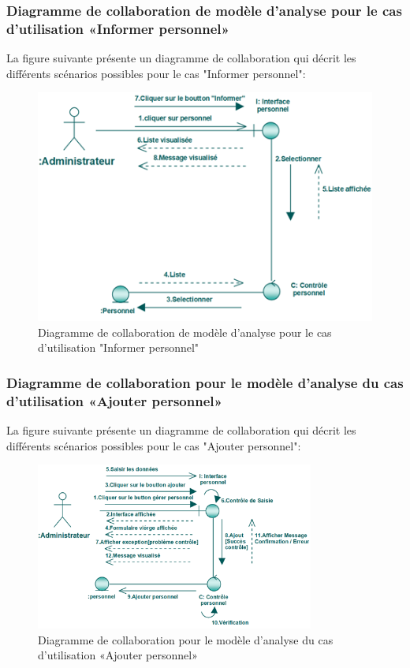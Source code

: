 \documentclass[12 pt]{report}
\begin{document}
\subsubsection{Diagramme  de  collaboration  de  modèle  d'analyse  pour  le  cas  d'utilisation «Informer personnel»  }
La figure suivante présente un diagramme de collaboration qui décrit les différents
scénarios possibles pour le cas "Informer personnel":
\begin{figure}[h]
\begin{center}
\includegraphics[width= 12 cm , height =7 cm]{colla_admin_informerpersonnel.png}
 \caption{Diagramme  de  collaboration  de  modèle  d'analyse  pour  le  cas  d'utilisation "Informer personnel"}
\end{center}
\end{figure}
\subsubsection{Diagramme de collaboration pour le modèle d’analyse du cas d'utilisation                                       «Ajouter personnel»}
La figure suivante présente un diagramme de collaboration qui décrit les différents
scénarios possibles pour le cas "Ajouter personnel":\begin{figure}[h]
 \begin{center}
\includegraphics[width= 12 cm ,height=  5.5cm]{collaajoutper.PNG}
\caption{Diagramme de collaboration pour le modèle d’analyse du cas d'utilisation                                       «Ajouter personnel»}

\end{center}
\end{figure}
\end{document}
